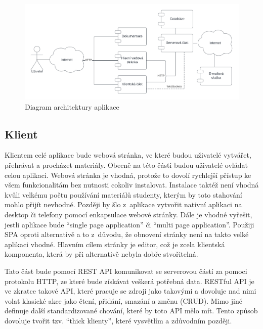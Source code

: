 \begin{figure}[ht!]
    \centering
    \includegraphics[width=1\textwidth]{media/04_navrh/architektura.pdf}
    \caption{Diagram architektury aplikace}\label{fig:architektura}
\end{figure}
 
\subsection{Klient}\label{text:navrh/klient}

Klientem celé aplikace bude webová stránka, ve které budou uživatelé vytvářet, přehrávat a procházet materiály. 
Obecně na této části budou uživatelé ovládat celou aplikaci.
Webová stránka je vhodná, protože to dovolí rychlejší přístup ke všem funkcionalitám bez nutnosti cokoliv instalovat.
Instalace taktéž není vhodná kvůli velkému počtu používání materiálů studenty, kterým by toto stahování mohlo přijít nevhodné.
Později by šlo z~aplikace vytvořit nativní aplikaci na desktop či telefony pomocí enkapsulace webové stránky.
Dále je vhodné vyřešit, jestli aplikace bude \enquote{single page application} či \enquote{multi page application}.
Použiji SPA oproti alternativě a to z~důvodu, že obnovení stránky není na takto velké aplikaci vhodné.
Hlavním cílem stránky je editor, což je zcela klientská komponenta, která by při alternativě nebyla dobře stvořitelná.  

Tato část bude pomocí REST API komunikovat se serverovou částí za pomoci protokolu HTTP, ze které bude získávat veškerá potřebná data.
RESTful API je ve zkratce takové API, které pracuje se zdroji jako takovými a dovoluje nad nimi volat klasické akce jako čtení, přidání, smazání a změnu (CRUD).
Mimo jiné definuje další standardizované chování, které by toto API mělo mít.
Tento způsob dovoluje tvořit tzv. \enquote{thick klienty}, které vysvětlím a zdůvodním později.

